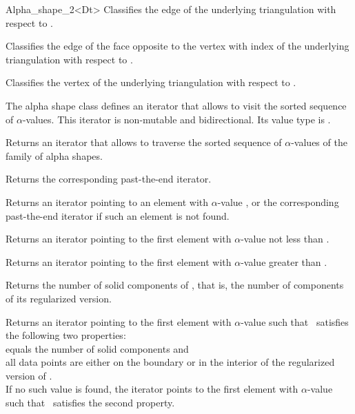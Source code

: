 \begin{ccClassTemplate} {Alpha_shape_2<Dt>}
{Classifies the edge  of the underlying triangulation with respect to \ccVar.}

{Classifies the edge of the face  opposite to the vertex with index
of the underlying triangulation with respect to \ccVar.}	

{Classifies the vertex  of the underlying triangulation with respect to \ccVar.}



\smallskip
The alpha shape class defines an iterator that allows to visit the
sorted sequence of $\alpha$-values. This iterator is
non-mutable and bidirectional. Its value type is
.

{Returns an iterator that allows to traverse the
sorted sequence of $\alpha$-values of the family of alpha shapes.}

{Returns the corresponding past-the-end iterator.}

{Returns an iterator pointing to an element with $\alpha$-value
, or the corresponding past-the-end iterator if such 
an element is not found.}

{Returns an iterator pointing to the first element with
$\alpha$-value not less than .}

{Returns an iterator pointing to the first element with $\alpha$-value
greater than .}


{Returns the number of solid components of \ccVar, that is, the number of
components of its 
regularized version.}

{Returns an iterator pointing to the first element with $\alpha$-value
such that \ccVar\ satisfies the following two properties:\\
 equals the number of solid components and \\
all data points are either on the boundary or in the interior of the regularized version of \ccVar.\\
If no such value is found, the iterator points to the first element with 
$\alpha$-value such that \ccVar\ satisfies the second property.}


\end{ccClassTemplate}
